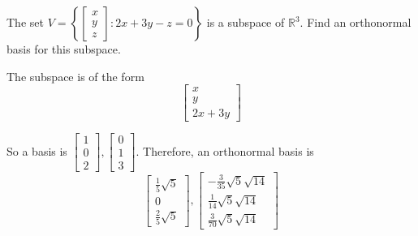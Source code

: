 \documentclass{ximera}
\begin{document}
\begin{problem}\label{prob:find_orthonormal_subspace_variables}  
The set $V =  \left\{ \left[
\begin{array}{r}
 x \\
y \\
z
\end{array}
\right] :2x+3y-z=0\right\} $ is
a subspace of $\mathbb{R}^{3}.$ Find an orthonormal basis for this subspace.
\begin{hint}
The subspace is of the form
\[
\left[
\begin{array}{c}
x \\
y \\
2x+3y
\end{array}
\right]
\]

So a basis is $\left[
\begin{array}{c}
1 \\
0 \\
2
\end{array}
\right] ,\left[
\begin{array}{c}
0 \\
1 \\
3
\end{array}
\right] $. Therefore, an orthonormal basis is
\[
\left[
\begin{array}{c}
\frac{1}{5}\sqrt{5} \\
0 \\
\frac{2}{5}\sqrt{5}
\end{array}
\right] ,\left[
\begin{array}{c}
-\frac{3}{35}\sqrt{5}\sqrt{14} \\
\frac{1}{14}\sqrt{5}\sqrt{14} \\
\frac{3}{70}\sqrt{5}\sqrt{14}
\end{array}
\right]
\]
\end{hint}
\end{problem}
\end{document}
